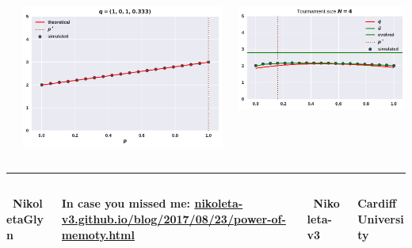 \documentclass[usenames,dvipsnames,t]{beamer}
\begin{document}
\begin{columns}
\begin{column}{.2\linewidth}
    \end{column}
    \begin{column}{.2\linewidth}
        \includegraphics[width=.8\textwidth]{static/plot_four}
    \end{column}
    \begin{column}{.2\linewidth}
        \includegraphics[width=.8\textwidth, height=0.57\textwidth]{static/tournament}
    \end{column}
\end{columns}
\vspace{0.3cm}

\hrule height 3pt
\begin{columns}
    \begin{column}{.1\linewidth}

        \centering
        \textbf{ \faTwitter \ NikoletaGlyn}
    \end{column}
    \begin{column}{.55\linewidth}

        \centering
        \textbf{ In case you missed me: \url{nikoleta-v3.github.io/blog/2017/08/23/power-of-memoty.html}}
    \end{column}
    \begin{column}{.1\linewidth}

        \centering
        \textbf{ \faGithub \ Nikoleta-v3}
    \end{column}
    \begin{column}{.1\linewidth}

        \centering
        \textbf{Cardiff University}
    \end{column}
\end{columns}
\end{document}
